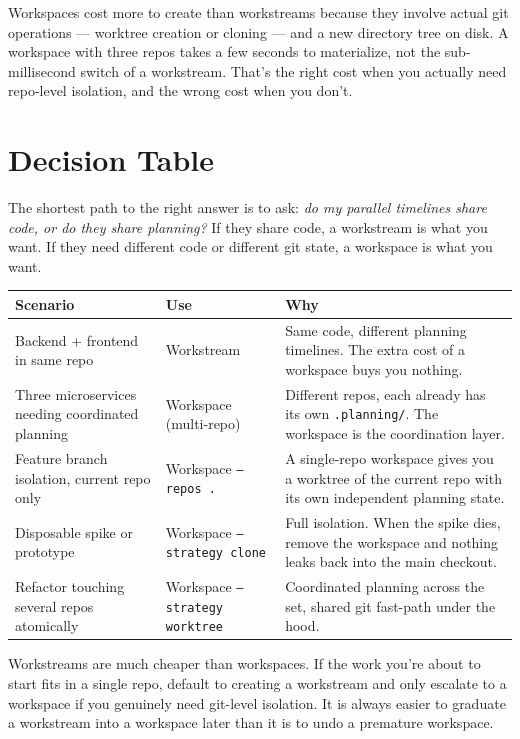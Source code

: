 \documentclass[11pt,letterpaper,openany]{book}
\begin{document}
Workspaces cost more to create than workstreams because they involve
actual git operations --- worktree creation or cloning --- and a new
directory tree on disk. A workspace with three repos takes a few
seconds to materialize, not the sub-millisecond switch of a workstream.
That's the right cost when you actually need repo-level isolation,
and the wrong cost when you don't.

\section{Decision Table}

The shortest path to the right answer is to ask: \emph{do my parallel
timelines share code, or do they share planning?} If they share code,
a workstream is what you want. If they need different code or different
git state, a workspace is what you want.

\begin{center}
\small
\begin{tabularx}{\linewidth}{@{}lXX@{}}
\toprule
\textbf{Scenario} & \textbf{Use} & \textbf{Why} \\
\midrule
Backend + frontend in same repo &
Workstream &
Same code, different planning timelines. The extra cost of a
workspace buys you nothing. \\
\addlinespace
Three microservices needing coordinated planning &
Workspace (multi-repo) &
Different repos, each already has its own
\texttt{.planning/}. The workspace is the coordination layer. \\
\addlinespace
Feature branch isolation, current repo only &
Workspace \texttt{--repos .} &
A single-repo workspace gives you a worktree of the current repo
with its own independent planning state. \\
\addlinespace
Disposable spike or prototype &
Workspace \texttt{--strategy clone} &
Full isolation. When the spike dies, remove the workspace and
nothing leaks back into the main checkout. \\
\addlinespace
Refactor touching several repos atomically &
Workspace \texttt{--strategy worktree} &
Coordinated planning across the set, shared git fast-path under
the hood. \\
\bottomrule
\end{tabularx}
\end{center}

\begin{gsdtip}
Workstreams are much cheaper than workspaces. If the work you're
about to start fits in a single repo, default to creating a workstream
and only escalate to a workspace if you genuinely need git-level
isolation. It is always easier to graduate a workstream into a
workspace later than it is to undo a premature workspace.
\end{gsdtip}
\end{document}
